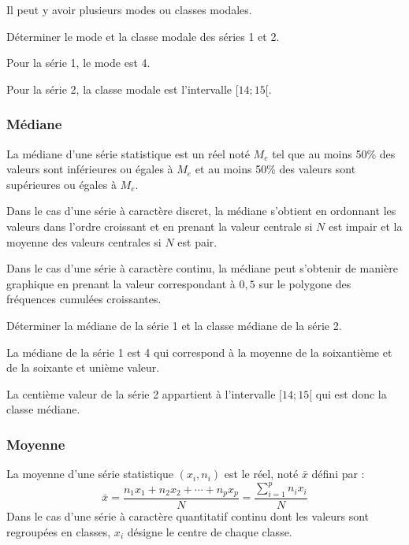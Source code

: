 \documentclass[french]{book}
\newcommand{\ds}{\displaystyle}
\begin{document}
\begin{rem}
Il peut y avoir plusieurs modes ou classes modales.
\end{rem}

\begin{exemple}
D\'eterminer le mode et la classe modale des s\'eries 1 et 2.
\end{exemple}


Pour la s\'erie 1, le mode est 4.

Pour la s\'erie 2, la classe modale est l'intervalle $[14;15[$.


\subsubsection*{M\'ediane}
\begin{defn}
La m\'ediane d'une s\'erie statistique est un r\'eel not\'e $M_e$ tel que au moins 50\% des valeurs sont inf\'erieures ou \'egales à $M_e$ et au moins 50\% des valeurs sont sup\'erieures ou \'egales à $M_e$.
\end{defn}

Dans le cas d'une s\'erie à caract\`ere discret, la m\'ediane s'obtient en ordonnant les valeurs dans l'ordre croissant et en prenant la valeur centrale si $N$ est impair et la moyenne des valeurs centrales si $N$ est pair.

Dans le cas d'une s\'erie à caract\`ere continu, la m\'ediane peut s'obtenir de mani\`ere graphique en prenant la valeur correspondant à $0,5$ sur le polygone des fr\'equences cumul\'ees croissantes.

\begin{exemple}
D\'eterminer la m\'ediane de la s\'erie 1 et la classe m\'ediane de la s\'erie 2.
\end{exemple}


La m\'ediane de la s\'erie 1 est 4 qui correspond à la moyenne de la soixanti\`eme et de la soixante et uni\`eme valeur.

La centi\`eme valeur de la s\'erie 2 appartient à l'intervalle $[14;15[$ qui est donc la classe m\'ediane.

\newpage
\subsubsection*{Moyenne}
\begin{defn}
La moyenne d'une s\'erie statistique $(x_i,n_i)$ est le r\'eel, not\'e $\bar{x}$ d\'efini par :
\[
\bar{x}= \frac{n_1 x_1+n_2 x_2+\cdots+ n_px_p}{N}=\frac{\ds\sum_{i=1}^{p}n_i x_i}{N}
\]
Dans le cas d'une s\'erie à caract\`ere quantitatif continu dont les valeurs sont regroup\'ees en classes, $x_i$ d\'esigne le centre de chaque classe.
\end{defn}
\end{document}
